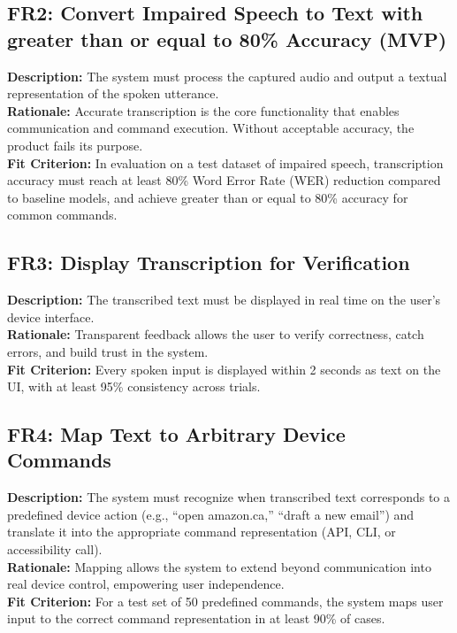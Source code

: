 \documentclass[11pt]{article}
\begin{document}
\bigskip
\subsection{FR2: Convert Impaired Speech to Text with greater than or equal to 80\% Accuracy (MVP)}\label{fr:FR2}
\textbf{Description:} The system must process the captured audio and output a textual representation of the spoken utterance.\\
\textbf{Rationale:} Accurate transcription is the core functionality that enables communication and command execution. Without acceptable accuracy, the product fails its purpose.\\
\textbf{Fit Criterion:} In evaluation on a test dataset of impaired speech, transcription accuracy must reach at least 80\% Word Error Rate (WER) reduction compared to baseline models, and achieve greater than or equal to 80\% accuracy for common commands.

\bigskip
\subsection{FR3: Display Transcription for Verification}\label{fr:FR3}
\textbf{Description:} The transcribed text must be displayed in real time on the user’s device interface.\\
\textbf{Rationale:} Transparent feedback allows the user to verify correctness, catch errors, and build trust in the system.\\
\textbf{Fit Criterion:} Every spoken input is displayed within 2 seconds as text on the UI, with at least 95\% consistency across trials.

\bigskip
\subsection{FR4: Map Text to Arbitrary Device Commands}\label{fr:FR4}
\textbf{Description:} The system must recognize when transcribed text corresponds to a predefined device action (e.g., “open amazon.ca,” “draft a new email”) and translate it into the appropriate command representation (API, CLI, or accessibility call).\\
\textbf{Rationale:} Mapping allows the system to extend beyond communication into real device control, empowering user independence.\\
\textbf{Fit Criterion:} For a test set of 50 predefined commands, the system maps user input to the correct command representation in at least 90\% of cases.
\end{document}
